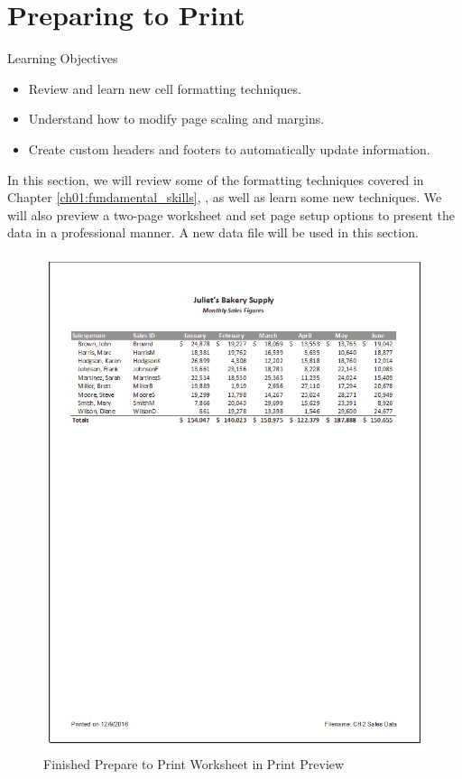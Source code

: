 \section{Preparing to Print}\label{ch02:preparing_to_print}

\begin{center}
	\begin{objbox}{Learning Objectives}
		\begin{itemize}
			\setlength{\itemsep}{0pt}
			\setlength{\parskip}{0pt}
			\setlength{\parsep}{0pt}
			
			\item Review and learn new cell formatting techniques.
			\item Understand how to modify page scaling and margins.
			\item Create custom headers and footers to automatically update information.

		\end{itemize}
	\end{objbox}
\end{center}

In this section, we will review some of the formatting techniques covered in Chapter \ref{ch01:fundamental_skills}, , as well as learn some new techniques. We will also preview a two-page worksheet and set page setup options to present the data in a professional manner. A new data file will be used in this section.

\begin{figure}[H]
	\centering
	\includegraphics[width=\maxwidth{.95\linewidth}]{gfx/ch02_fig40}
	\caption{Finished Prepare to Print Worksheet in Print Preview}
	\label{02:fig40}
\end{figure}

